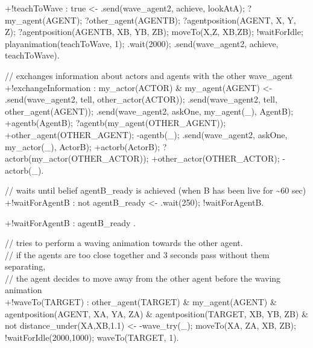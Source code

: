 \documentclass[draft,final]{vutinfth} %
\begin{document}
{+!teachToWave : true
                    <-  .send(wave\_agent2, achieve, lookAtA);
                        ?my\_agent(AGENT);
                        ?other\_agent(AGENTB);
                        ?agentposition(AGENT, X, Y, Z);
                        ?agentposition(AGENTB, XB, YB, ZB);
                        moveTo(X,Z, XB,ZB);
                        !waitForIdle;
                        playanimation(teachToWave, 1);
                        .wait(2000);        
                        .send(wave\_agent2, achieve, teachToWave).

// exchanges information about actors and agents with the other wave\_agent\\
+!exchangeInformation : my\_actor(ACTOR) \& my\_agent(AGENT)
                    <-  .send(wave\_agent2, tell, other\_actor(ACTOR));
                        .send(wave\_agent2, tell, other\_agent(AGENT));
                        .send(wave\_agent2, askOne, my\_agent(\_), AgentB);
                        +agentb(AgentB);
                        ?agentb(my\_agent(OTHER\_AGENT));
                        +other\_agent(OTHER\_AGENT);
                        -agentb(\_);
                        .send(wave\_agent2, askOne, my\_actor(\_), ActorB);
                        +actorb(ActorB);
                        ?actorb(my\_actor(OTHER\_ACTOR));
                        +other\_actor(OTHER\_ACTOR);
                        -actorb(\_).

// waits until belief agentB\_ready is achieved (when B has been live for \~{}60 sec)\\
+!waitForAgentB : not agentB\_ready
                    <-  .wait(250);
                        !waitForAgentB.

+!waitForAgentB : agentB\_ready .

// tries to perform a waving animation towards the other agent.\\
// if the agents are too close together and 3 seconds pass without them separating,\\
// the agent decides to move away from the other agent before the waving animation \\
+!waveTo(TARGET) :  other\_agent(TARGET) \&
                    my\_agent(AGENT) \&
                    agentposition(AGENT, XA, YA, ZA) \&
                    agentposition(TARGET, XB, YB, ZB) \&
                    not distance\_under(XA,XB,1.1)
                    <-  -wave\_try(\_);
                        moveTo(XA, ZA, XB, ZB);
                        !waitForIdle(2000,1000);
                        waveTo(TARGET, 1).

}
\end{document}
